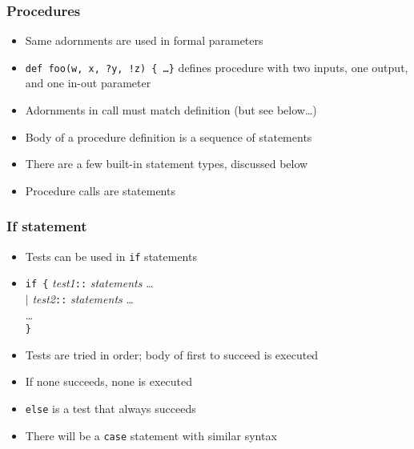 \documentclass[12pt]{beamer}
\begin{document}
\begin{frame}[fragile]
\frametitle{Procedures}
\begin{itemize}
\item Same adornments are used in formal parameters
\item \texttt{def foo(w, x, ?y, !z) \{ \ldots \}} defines procedure with two
  inputs, one output, and one in-out parameter
\item Adornments in call must match definition (but see below\ldots)
\item Body of a procedure definition is a sequence of
  statements
\item There are a few built-in statement types, discussed below
\item Procedure calls are statements
\end{itemize}
\end{frame}


\begin{frame}[fragile]
\frametitle{If statement}
\begin{itemize}
\item Tests can be used in \texttt{if} statements
\item \texttt{if \{} \emph{test1}\texttt{::} \emph{statements} \ldots \\
\hspace*{1.5em} \texttt{$\mid$} \emph{test2}\texttt{::} \emph{statements} \ldots \\
\hspace*{1.5em} \ldots \\
\texttt{\}}
\item Tests are tried in order; body of first to succeed is executed
\item If none succeeds, none is executed
\item \texttt{else} is a test that always succeeds
\item There will be a \texttt{case} statement with similar syntax
\end{itemize}
\end{frame}
\end{document}
